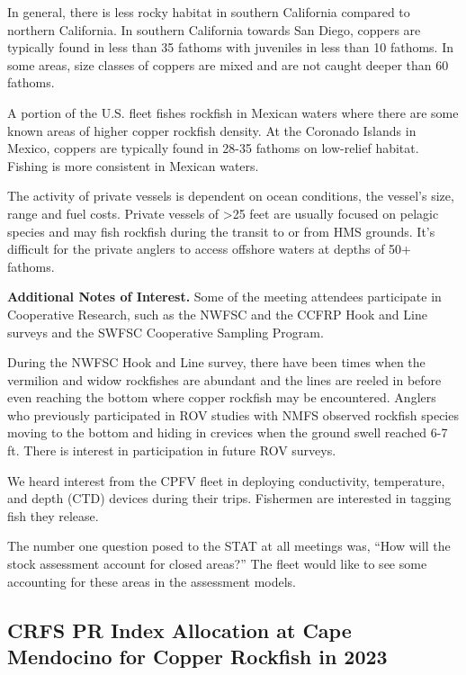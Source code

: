 \documentclass[11pt,
  letterpaper,
]{article}
\begin{document}
In general, there is less rocky habitat in southern California compared to northern California. In southern California towards San Diego, coppers are typically found in less than 35 fathoms with juveniles in less than 10 fathoms. In some areas, size classes of coppers are mixed and are not caught deeper than 60 fathoms.

A portion of the U.S. fleet fishes rockfish in Mexican waters where there are some known areas of higher copper rockfish density. At the Coronado Islands in Mexico, coppers are typically found in 28-35 fathoms on low-relief habitat. Fishing is more consistent in Mexican waters.

The activity of private vessels is dependent on ocean conditions, the vessel's size, range and fuel costs. Private vessels of \textgreater25 feet are usually focused on pelagic species and may fish rockfish during the transit to or from HMS grounds. It's difficult for the private anglers to access offshore waters at depths of 50+ fathoms.

\textbf{Additional Notes of Interest.} Some of the meeting attendees participate in Cooperative Research, such as the NWFSC and the CCFRP Hook and Line surveys and the SWFSC Cooperative Sampling Program.

During the NWFSC Hook and Line survey, there have been times when the vermilion and widow rockfishes are abundant and the lines are reeled in before even reaching the bottom where copper rockfish may be encountered. Anglers who previously participated in ROV studies with NMFS observed rockfish species moving to the bottom and hiding in crevices when the ground swell reached 6-7 ft. There is interest in participation in future ROV surveys.

We heard interest from the CPFV fleet in deploying conductivity, temperature, and depth (CTD) devices during their trips. Fishermen are interested in tagging fish they release.

The number one question posed to the STAT at all meetings was, ``How will the stock assessment account for closed areas?'' The fleet would like to see some accounting for these areas in the assessment models.

\subsection{CRFS PR Index Allocation at Cape Mendocino for Copper Rockfish in 2023}\label{crfs-pr-index-allocation-at-cape-mendocino-for-copper-rockfish-in-2023}
\end{document}
